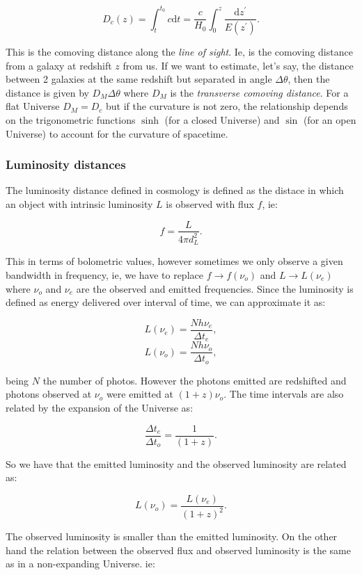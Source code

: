 \documentclass[
  letterpaper,
  DIV=11,
  numbers=noendperiod]{scrreprt}
\begin{document}
\[D_c(z) = \int_{t}^{t_0} c\mathrm{ d} t = \frac{c}{H_0} \int^z_0 \frac{\mathrm{ d}z^\prime}{E(z^\prime)}.\]

This is the comoving distance along the \emph{line of sight}. Ie, is the
comoving distance from a galaxy at redshift \(z\) from us. If we want to
estimate, let's say, the distance between 2 galaxies at the same
redshift but separated in angle \(\Delta \theta\), then the distance is
given by \(D_M \Delta \theta\) where \(D_M\) is the \emph{transverse
comoving distance}. For a flat Universe \(D_M = D_c\) but if the
curvature is not zero, the relationship depends on the trigonometric
functions \(\sinh\) (for a closed Universe) and \(\sin\) (for an open
Universe) to account for the curvature of spacetime.

\subsubsection{Luminosity distances}\label{luminosity-distances}

The luminosity distance defined in cosmology is defined as the distace
in which an object with intrinsic luminosity \(L\) is observed with flux
\(f\), ie:

\[ f = \frac{L}{4\pi d_L^2}.\]

This in terms of bolometric values, however sometimes we only observe a
given bandwidth in frequency, ie, we have to replace
\(f\rightarrow f(\nu_o)\) and \(L \rightarrow L(\nu_{e})\) where
\(\nu_o\) and \(\nu_e\) are the observed and emitted frequencies. Since
the luminosity is defined as energy delivered over interval of time, we
can approximate it as:

\[ L(\nu_e) = \frac{Nh\nu_e}{\Delta t_e},\]
\[ L(\nu_o) = \frac{Nh\nu_o}{\Delta t_o},\]

being \(N\) the number of photos. However the photons emitted are
redshifted and photons observed at \(\nu_o\) were emitted at
\((1+z)\nu_o\). The time intervals are also related by the expansion of
the Universe as:

\[\frac{\Delta t_e}{\Delta t_o} = \frac{1}{(1+z)}.\]

So we have that the emitted luminosity and the observed luminosity are
related as:

\[L(\nu_o) = \frac{L(\nu_e)}{(1+z)^2}.\]

The observed luminosity is smaller than the emitted luminosity. On the
other hand the relation between the observed flux and observed
luminosity is the same as in a non-expanding Universe. ie:
\end{document}
